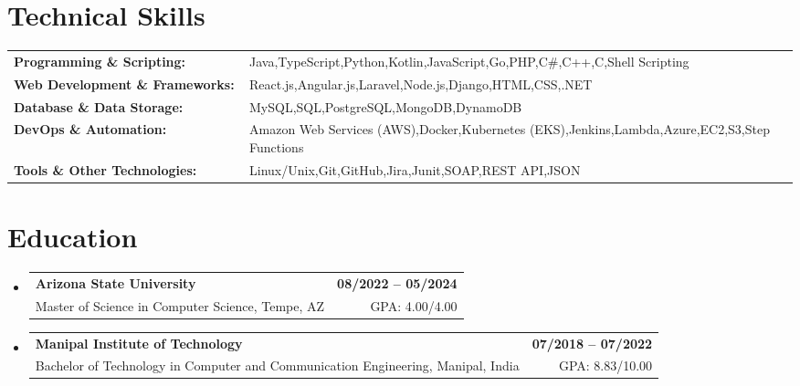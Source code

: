 \documentclass[letterpaper,11pt]{article}
\makeatletter
\newcommand{\educationSubheading}[4]{
  \vspace{-2pt}\item
    \begin{tabular*}{1.0\textwidth}[t]{l@{\extracolsep{\fill}}r}
      \textbf{\small #1} & \textbf{\small #2} \\
      {\small#3} & {\small #4} \\
    \end{tabular*}\vspace{-7pt}
}
\newcommand{\resumeSubHeadingListStart}{\begin{itemize}[leftmargin=0pt, label={}]}
\newcommand{\resumeSubHeadingListEnd}{\end{itemize}}
\makeatother
\begin{document}
\section{Technical Skills}
        \vspace{-14pt}
        \begin{table}[h]
            \footnotesize
            \begin{tabular}{p{0.3\linewidth} p{0.7\linewidth}}
                \textbf{Programming \& Scripting:} & Java,TypeScript,Python,Kotlin,JavaScript,Go,PHP,C\#,C++,C,Shell Scripting \\
                \textbf{Web Development \& Frameworks:} & React.js,Angular.js,Laravel,Node.js,Django,HTML,CSS,.NET \\
                \textbf{Database \& Data Storage:} & MySQL,SQL,PostgreSQL,MongoDB,DynamoDB \\
                \textbf{DevOps \& Automation:} & Amazon Web Services (AWS),Docker,Kubernetes (EKS),Jenkins,Lambda,Azure,EC2,S3,Step Functions \\
                \textbf{Tools \& Other Technologies:} & Linux/Unix,Git,GitHub,Jira,Junit,SOAP,REST API,JSON \\
            \end{tabular}
        \end{table}

 \vspace{-15pt}

\section{Education}
  \resumeSubHeadingListStart
    \educationSubheading
      {Arizona State University}{08/2022 -- 05/2024}
      {Master of Science in Computer Science, Tempe, AZ}{GPA: 4.00/4.00}

    \educationSubheading
      {Manipal Institute of Technology}{07/2018 -- 07/2022}
      {Bachelor of Technology in Computer and Communication Engineering, Manipal, India}{GPA: 8.83/10.00}
  \resumeSubHeadingListEnd
\end{document}
